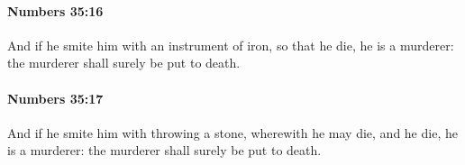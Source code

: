 		\paragraph{Numbers 35:16} %
			\label{NUMBERS-35-16}

			And if he smite him with an instrument of iron, so that he die, he is a murderer: the murderer shall surely be put to death.


		\paragraph{Numbers 35:17} %
			\label{NUMBERS-35-17}

			And if he smite him with throwing a stone, wherewith he may die, and he die, he is a murderer: the murderer shall surely be put to death.


